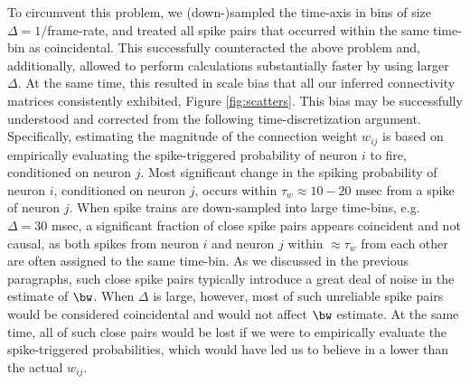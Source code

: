 To circumvent this problem, we (down-)sampled the time-axis in bins of size $\Delta=1/$frame-rate, and treated all spike pairs that occurred within the same time-bin as coincidental. This successfully counteracted the above problem and, additionally, allowed to perform calculations substantially faster by using larger $\Delta$. At the same time, this resulted in scale bias that all our inferred  connectivity matrices consistently exhibited, Figure \ref{fig:scatters}. This bias may be successfully understood and corrected from the following time-discretization argument.
Specifically, estimating the magnitude of the connection weight $w_{ij}$ is based on empirically evaluating the spike-triggered probability of neuron $i$ to fire, conditioned on neuron $j$. Most significant change in the spiking probability of neuron $i$, conditioned on neuron $j$, occurs within $\tau_w \approx 10-20$ msec from a spike of neuron $j$.
When spike trains are down-sampled into large time-bins, e.g. $\Delta = 30$ msec, a significant fraction of close spike pairs appears coincident and not causal, as both spikes from neuron $i$ and neuron $j$ within $\approx \tau_w$ from each other are often assigned to the same time-bin.
As we discussed in the previous paragraphs, such close spike pairs typically introduce a great deal of noise in the estimate of $\bw$.
When $\Delta$ is large, however, most of such unreliable spike pairs would be considered coincidental and would not affect $\bw$ estimate. At the same time, all of such close pairs would be lost if we were to empirically evaluate the spike-triggered probabilities, which would have led us to believe in a lower than the actual  $w_{ij}$.


%

